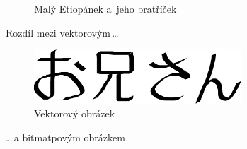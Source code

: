 \documentclass[a4paper,11pt]{article}
\begin{document}
\begin{figure}[h]
{ }
\caption{Malý Etiopánek a~jeho bratříček}
\label{obr1}
\end{figure}
\bigskip
\pagebreak

Rozdíl mezi vektorovým\,\dots

\begin{figure}[h]
\centering
\includegraphics[width=220pt]{oniisan.eps}	
\caption{Vektorový obrázek}
\label{obr2}
\end{figure}

\noindent\dots\,a bitmatpovým obrázkem
\end{document}
